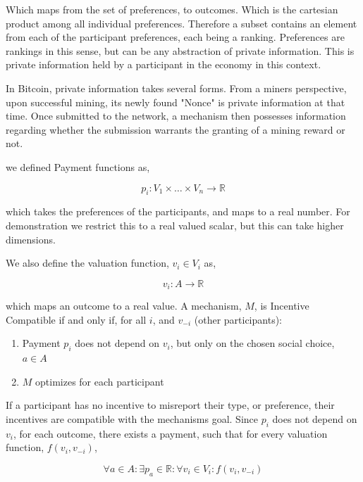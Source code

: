 \documentclass[12pt, titlepage, twocolumn]{report}
\begin{document}
Which maps from the set of preferences, to outcomes. Which is the cartesian product among all individual preferences. Therefore a subset contains an element from each of the participant preferences, each being a ranking.  Preferences are rankings in this sense, but can be any abstraction of private information. This is private information held by a participant in the economy in this context. 

In Bitcoin, private information takes several forms. From a miners perspective, upon successful mining, its newly found "Nonce" is private information at that time. Once submitted to the network, a mechanism then possesses information regarding whether the submission warrants the granting of a mining reward or not. 

we defined Payment functions as,

\begin{equation}
p_i : V_1 \times \ldots \times V_n \rightarrow \mathbb{R}
\end{equation}

which takes the preferences of the participants, and maps to a real number. For demonstration we restrict this to a real valued scalar, but this can take higher dimensions.

We also define the valuation function, \(v_i \in V_i \) as,

\begin{equation}
v_i : A \rightarrow \mathbb{R}
\end{equation}

which maps an outcome to a real value. A mechanism, \(M\), is Incentive Compatible if and only if, for all \(i\), and \(v_{-i}\) (other participants):

\begin{enumerate}
\item Payment \(p_i\) does not depend on \(v_i\), but only on the chosen social choice, \(a \in A\)
\item \(M\) optimizes for each participant
\end{enumerate}

If a participant has no incentive to misreport their type, or preference, their incentives are compatible with the mechanisms goal. Since \(p_i\) does not depend on \(v_i\), for each outcome, there exists a payment, such that for every valuation function, \(f(v_i,v_{-i})\),

\begin{equation}
\forall a \in A : \exists p_a \in \mathbb{R} : \forall v_i \in V_i : f (v_i, v_{-i}) 
\end{equation}
\end{document}
